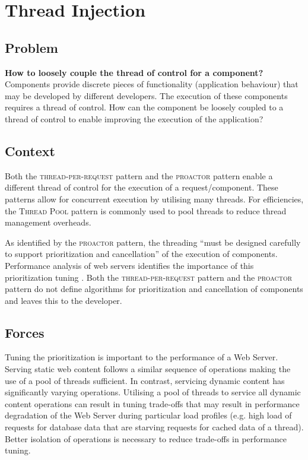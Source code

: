 \documentclass[prodmode]{style/acmlarge}
\begin{document}
\section{Thread Injection}


\subsection{Problem}

\textbf{How to loosely couple the thread of control for a component?} 
Components provide discrete pieces of functionality (application behaviour) that
may be developed by different developers.  The execution of these components
requires a thread of control.  How can the component be loosely coupled to a
thread of control to enable improving the execution of the application?


\subsection{Context}

Both the \textsc{thread-per-request} pattern \cite{thread-per-request} and the
\textsc{proactor} pattern \cite{proactor} enable a different thread of control
for the execution of a request/component.  These patterns allow for concurrent
execution by utilising many threads.  For efficiencies, the \textsc{Thread Pool}
pattern \cite{thread-per-request} is commonly used to pool threads to reduce
thread management overheads.

As identified by the \textsc{proactor} pattern, the threading ``must be designed
carefully to support prioritization and cancellation'' \cite[p. 8]{proactor} of
the execution of components.  Performance analysis of web servers identifies the
importance of this prioritization tuning
\cite{tuning-important,low-server-footprint,tuning-os-important}.  Both the
\textsc{thread-per-request} pattern and the \textsc{proactor} pattern do not
define algorithms for prioritization and cancellation of components and leaves
this to the developer.


\subsection{Forces}

Tuning the prioritization is important to the performance of a Web Server.
Serving static web content follows a similar sequence of operations making the
use of a pool of threads sufficient.  In contrast, servicing dynamic content has
significantly varying operations.  Utilising a pool of threads to service all
dynamic content operations can result in tuning trade-offs that may result in
performance degradation of the Web Server during particular load profiles (e.g.
high load of requests for database data that are starving requests for cached
data of a thread).  Better isolation of operations is necessary to reduce
trade-offs in performance tuning.
\end{document}
